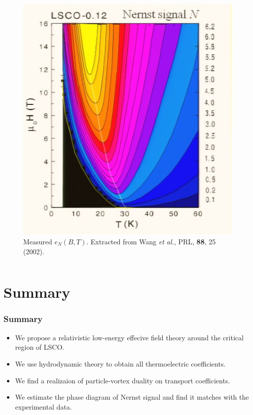 \documentclass[10pt,aspectratio=43,xcolor=x11names,t]{beamer}%
\begin{document}
\begin{frame}
{\begin{columns}
\begin{column}{0.45\textwidth}
\begin{figure}[!htp]
						\includegraphics[scale=0.3]{Wang.png}
						\caption{Measured $e_N(B,T)$. Extracted from {\scriptsize Wang \textit{et al.}, PRL, \textbf{88}, 25 (2002)}.}
					\end{figure}
					
				\end{column}
			\end{columns}}
		\end{frame}
		
		
\section{Summary}
	\begin{frame}\frametitle{Summary}
		\begin{itemize}
			\item We propose a relativistic low-energy effecive field theory around the critical region of LSCO.
			\item We use hydrodynamic theory to obtain all thermoelectric coefficients.
			\item We find a realizaion of particle-vortex duality on transport coefficients.
			\item We estimate the phase diagram of Nernst signal and find it matches with the experimental data. 
		\end{itemize}
	\end{frame}
\end{document}
